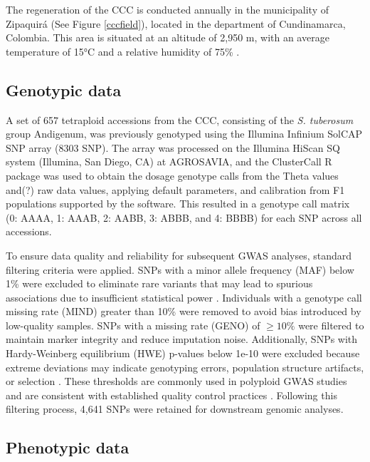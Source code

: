 \documentclass[pdflatex,sn-mathphys-ay]{sn-jnl}%
\begin{document}
The regeneration of the CCC is conducted annually in the municipality of Zipaquirá (See Figure \ref{cccfield}), located in the department of Cundinamarca, Colombia. This area is situated at an altitude of 2,950 m, with an average temperature of 15°C and a relative humidity of 75\% \citep{Berdugo2017}.

\subsection{Genotypic data}

A set of 657 tetraploid accessions from the CCC, consisting of the  \textit{S. tuberosum} group Andigenum, was previously genotyped \citep{Berdugo2017} using the Illumina Infinium SolCAP SNP array (8303 SNP). The array was processed on the Illumina HiScan SQ system (Illumina, San Diego, CA) at AGROSAVIA, and the ClusterCall R package \citep{Schmitz2017} was used to obtain the dosage genotype calls from the Theta values and(?) raw data values, applying default parameters, and calibration from F1 populations supported by the software. This resulted in a genotype call matrix (0: AAAA, 1: AAAB, 2: AABB, 3: ABBB, and 4: BBBB) for each SNP across all accessions.


To ensure data quality and reliability for subsequent GWAS analyses, standard filtering criteria were applied. SNPs with a minor allele frequency (MAF) below 1\% were excluded to eliminate rare variants that may lead to spurious associations due to insufficient statistical power \citep{Anderson2010}. Individuals with a genotype call missing rate (MIND) greater than 10\% were removed to avoid bias introduced by low-quality samples. SNPs with a missing rate (GENO) of $\geq 10\%$ were filtered to maintain marker integrity and reduce imputation noise. Additionally, SNPs with Hardy-Weinberg equilibrium (HWE) p-values below 1e-10 were excluded because extreme deviations may indicate genotyping errors, population structure artifacts, or selection \citep{Wigginton2005}.  These thresholds are commonly used in polyploid GWAS studies and are consistent with established quality control practices \citep{Lu2013,Pavan2020}. Following this filtering process, 4,641 SNPs were retained for downstream genomic analyses.


\subsection{Phenotypic data }
\end{document}

